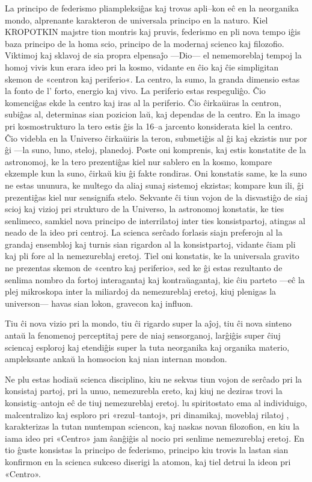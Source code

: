 La principo de federismo pliampleksiĝas kaj trovas apli–kon eĉ en la neorganika mondo, alprenante karakteron de universala principo en la naturo. Kiel KROPOTKIN majstre tion montris kaj pruvis, federismo en pli nova tempo iĝis baza principo de la homa scio, principo de la modernaj scienco kaj filozofio. Viktimoj kaj sklavoj de sia propra elpensaĵo —Dio— el nememoreblaj tempoj la homoj vivis kun erara ideo pri la kosmo, vidante en ĉio kaj ĉie simpligitan skemon de «centron kaj periferio«. La centro, la sumo, la granda dimensio estas la fonto de l’ forto, energio kaj vivo. La periferio estas respeguliĝo. Ĉio komenciĝas ekde la centro kaj iras al la periferio. Ĉio ĉirkaŭiras la centron, subiĝas al, determinas sian pozicion laŭ, kaj dependas de la centro. En la imago pri kosmostrukturo la tero estis ĝis la 16–a jarcento konsiderata kiel la centro. Ĉio videbla en la Universo ĉirkaŭiris la teron, submetiĝis al ĝi kaj ekzistis nur por ĝi —la suno, luno, steloj, planedoj. Poste oni komprenis, kaj estis konstatite de la astronomoj, ke la tero prezentiĝas kiel nur sablero en la kosmo, kompare ekzemple kun la suno, ĉirkaŭ kiu ĝi fakte rondiras. Oni konstatis same, ke la suno ne estas ununura, ke multego da aliaj sunaj sistemoj ekzistas; kompare kun ili, ĝi prezentiĝas kiel nur sensignifa stelo. Sekvante ĉi tiun vojon de la disvastiĝo de siaj scioj kaj vizioj pri strukturo de la Universo, la astronomoj konstatis, ke ties senlimeco, samkiel nova principo de interrilatoj inter ties konsistpartoj, atingas al neado de la ideo pri centroj. La scienca serĉado forlasis siajn preferojn al la grandaj ensembloj kaj turnis sian rigardon al la konsistpartoj, vidante ĉiam pli kaj pli fore al la nemezureblaj eretoj. Tiel oni konstatis, ke la universala gravito ne prezentas skemon de «centro kaj periferio», sed ke ĝi estas rezultanto de senlima nombro da fortoj interagantaj kaj kontraŭagantaj, kie ĉiu parteto —eĉ la plej mikroskopa inter la miliardoj da nemezureblaj eretoj, kiuj plenigas la universon— havas sian lokon, gravecon kaj influon.

Tiu ĉi nova vizio pri la mondo, tiu ĉi rigardo super la aĵoj, tiu ĉi nova sinteno antaŭ la fenomenoj perceptitaj pere de niaj sensorganoj, larĝiĝis super ĉiuj sciencaj esploroj kaj etendiĝis super la tuta neorganika kaj organika materio, ampleksante ankaŭ la homsocion kaj nian internan mondon.

Ne plu estas hodiaŭ scienca disciplino, kiu ne sekvas tiun vojon de serĉado pri la konsistaj partoj, pri la unuo, nemezurebla ereto, kaj kiuj ne deziras trovi la konsistig–antojn eĉ de tiuj nemezureblaj eretoj. lu spiritostato ema al individuigo, malcentralizo kaj esploro pri «rezul–tantoj», pri dinamikaj, moveblaj rilatoj , karakterizas la tutan nuntempan sciencon, kaj naskas novan filozofion, en kiu la iama ideo pri «Centro» jam ŝanĝiĝis al nocio pri senlime nemezureblaj eretoj. En tio ĝuste konsistas la principo de federismo, principo kiu trovis la lastan sian konfirmon en la scienca sukceso diserigi la atomon, kaj tiel detrui la ideon pri «Centro».

